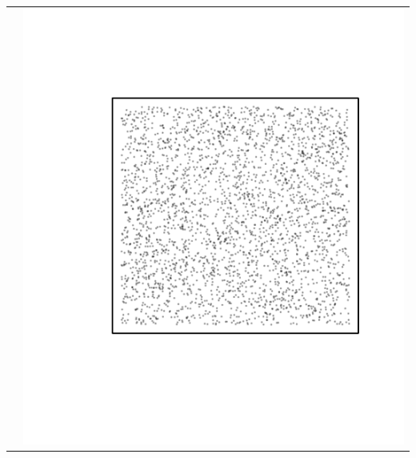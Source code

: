 \documentclass{article}\usepackage{graphicx, color}
\makeatletter
\def\maxwidth{ %
  \ifdim\Gin@nat@width>\linewidth
    \linewidth
  \else
    \Gin@nat@width
  \fi
}
\newenvironment{knitrout}{}{} %
\makeatother
\begin{document}
\begin{tabular}{cc}
&
\begin{knitrout}
\definecolor{shadecolor}{rgb}{0.969, 0.969, 0.969}\color{fgcolor}\includegraphics[width=\maxwidth]{figure/unnamed-chunk-26} 
\end{knitrout}

\\
\end{tabular}
\end{document}
